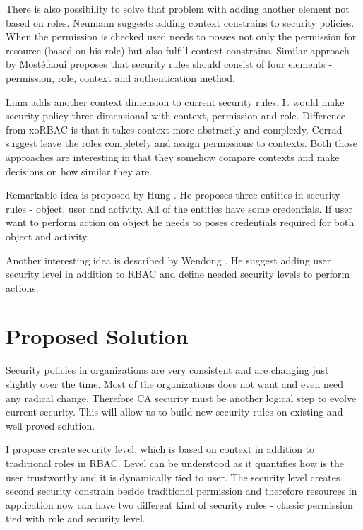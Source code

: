 \documentclass{poster15}
\begin{document}
There is also possibility to solve that problem with adding another element not based on roles. Neumann \cite{xorbac} suggests adding context constrains to security policies. When the permission is checked used needs to posses not only the permission for resource (based on his role) but also fulfill context constrains. Similar approach by Most\'efaoui \cite{genericcontext} proposes that security rules should consist of four elements - permission, role, context and authentication method.

Lima \cite{contextlayer} adds another context dimension to current security rules. It would make security policy three dimensional with context, permission and role. Difference from xoRBAC \cite{xorbac} is that it takes context more abstractly and complexly. Corrad \cite{ubiscom} suggest leave the roles completely and assign permissions to contexts. Both those approaches are interesting in that they somehow compare contexts and make decisions on how similar they are.

Remarkable idea is proposed by Hung \cite{hung}. He proposes three entities in security rules - object, user and activity. All of the entities have some credentials. If user want to perform action on object he needs to poses credentials required for both object and activity.

Another interesting idea is described by Wendong \cite{wendong}. He suggest adding user security level in addition to RBAC and define needed security levels to perform actions.

\section{Proposed Solution}

Security policies in organizations are very consistent and are changing just slightly over the time. Most of the organizations does not want and even need any radical change. Therefore CA security must be another logical step to evolve current security. This will allow us to build new security rules on existing and well proved solution.

I propose create security level, which is based on context in addition to traditional roles in RBAC. Level can be understood as it quantifies how is the user trustworthy and it is dynamically tied to user. The security level creates second security constrain beside traditional permission and therefore resources in application now can have two different kind of security rules - classic permission tied with role and security level.
\end{document}

